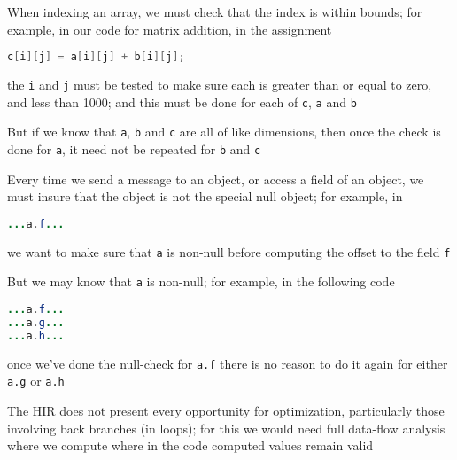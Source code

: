 \documentclass[8pt,a4paper,compress]{beamer}
\begin{document}
\begin{frame}[fragile]
\pause

When indexing an array, we must check that the index is within bounds; for example, in our code for matrix addition, in the assignment

\begin{lstlisting}[language=Java]
c[i][j] = a[i][j] + b[i][j];
\end{lstlisting}
\noindent the \lstinline{i} and \lstinline{j} must be tested to make sure each is greater than or equal to zero, and less than 1000; and this must be done for each of \lstinline{c}, \lstinline{a} and \lstinline{b}

\pause
\bigskip

But if we know that \lstinline{a}, \lstinline{b} and \lstinline{c} are all of like dimensions, then once the check is done for \lstinline{a}, it need not be repeated for \lstinline{b} and \lstinline{c}

\pause
\bigskip

Every time we send a message to an object, or access a field of an object, we must insure that the object is not the special null object; for example, in
\begin{lstlisting}[language=Java]
...a.f...
\end{lstlisting}
we want to make sure that \lstinline{a} is non-null before computing the offset to the field \lstinline{f}

\pause
\bigskip

But we may know that \lstinline{a} is non-null; for example, in the following code
\begin{lstlisting}[language=Java]
...a.f...
...a.g...
...a.h...
\end{lstlisting}
once we've done the null-check for \lstinline{a.f} there is no reason to do it again for either \lstinline{a.g} or \lstinline{a.h}

\pause
\bigskip

The HIR does not present every opportunity for optimization, particularly those involving
back branches (in loops); for this we would need full data-flow analysis where we compute where in the code computed values remain valid
\end{frame}
\end{document}
